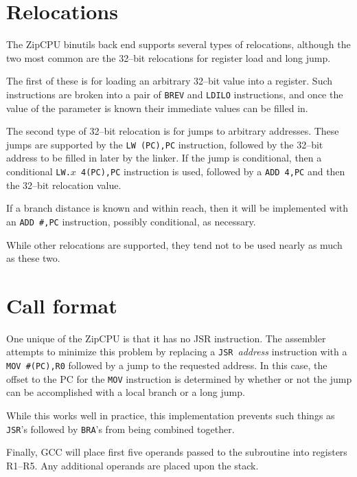 \documentclass{gqtekspec}
\begin{document}
\section{Relocations}\label{sec:abi-reloc}

The ZipCPU binutils back end supports several types of relocations, although
the two most common are the 32--bit relocations for register load and long
jump.

The first of these is for loading an arbitrary 32--bit value into a register. 
Such instructions are broken into a pair of {\tt BREV} and {\tt LDILO}
instructions, and once the value of the parameter is known their immediate
values can be filled in.

The second type of 32--bit relocation is for jumps to arbitrary addresses.
These jumps are supported by the \hbox{\tt LW (PC),PC} instruction, followed
by the 32--bit address to be filled in later by the linker.  If the jump is
conditional, then a conditional \hbox{\tt LW.$x$ 4(PC),PC} instruction is
used, followed by a {\tt ADD 4,PC} and then the 32--bit relocation value.

If a branch distance is known and within reach, then it will be implemented
with an {\tt ADD \#,PC} instruction, possibly conditional, as necessary.

While other relocations are supported, they tend not to be used nearly as much
as these two.

\section{Call format}\label{sec:abi-jsr}

One unique of the ZipCPU is that it has no JSR instruction.  The assembler
attempts to minimize this problem by replacing a {\tt JSR}~{\em address}
instruction with a {\tt MOV \#(PC),R0} followed by a jump to the requested
address.  In this case, the offset to the PC for the {\tt MOV} instruction
is determined by whether or not the jump can be accomplished with a local
branch or a long jump.

While this works well in practice, this implementation prevents such things
as {\tt JSR}'s followed by {\tt BRA}'s from being combined together.

Finally, GCC will place first five operands passed to the subroutine into
registers R1--R5.  Any additional operands are placed upon the stack.
\end{document}

